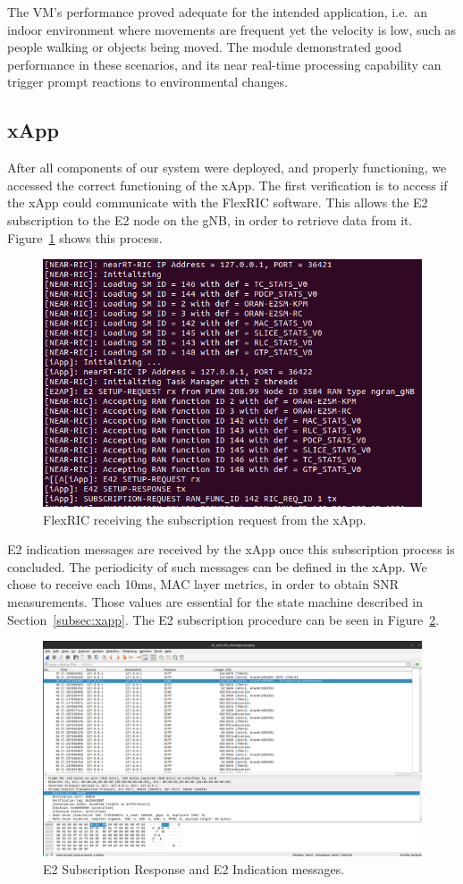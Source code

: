 The VM's performance proved adequate for the intended application, i.e.\ an indoor environment where movements are frequent yet the velocity is low, such as people walking or objects being moved.
The module demonstrated good performance in these scenarios, and its near real-time processing capability can trigger prompt reactions to environmental changes.

\subsection{xApp}\label{subsec:mm_xapp}
After all components of our system were deployed, and properly functioning, we accessed the correct functioning of the xApp.
The first verification is to access if the xApp could communicate with the FlexRIC software.
This allows the E2 subscription to the E2 node on the gNB, in order to retrieve data from it.
Figure~\ref{fig:xapp_subscription} shows this process.

\begin{figure}[H]
    \centering
    \includegraphics[width=0.5\linewidth]{figures/xapp_subscription}
    \caption{FlexRIC receiving the subscription request from the xApp.}
    \label{fig:xapp_subscription}
\end{figure}

E2 indication messages are received by the xApp once this subscription process is concluded.
The periodicity of such messages can be defined in the xApp.
We chose to receive each 10ms, MAC layer metrics, in order to obtain SNR measurements.
Those values are essential for the state machine described in Section~\ref{subsec:xapp}.
The E2 subscription procedure can be seen in Figure~\ref{fig:captura_e2ap}.

\begin{figure}[H]
    \centering
    \includegraphics[width=0.5\linewidth]{figures/ric_subs}
    \caption{E2 Subscription Response and E2 Indication messages.}
    \label{fig:captura_e2ap}
\end{figure}

